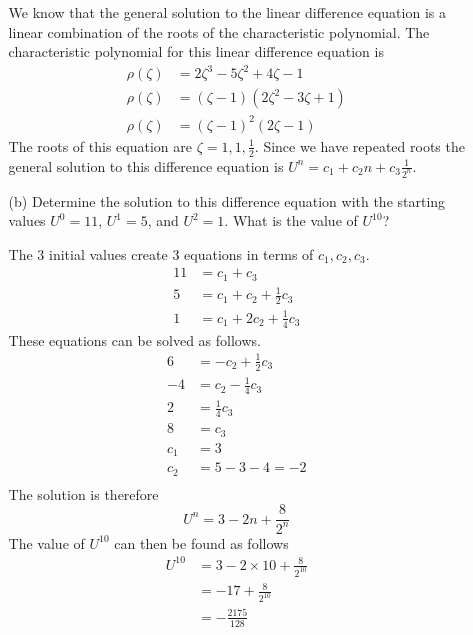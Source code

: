 \documentclass[11pt, oneside, titlepage]{article}
\begin{document}
\begin{enumerate}
\begin{enumerate}
                We know that the general solution to the linear difference
                equation is a linear combination of the roots of the
                characteristic polynomial.
                The characteristic polynomial for this linear difference
                equation is
                \begin{align*}
                    \rho(\zeta) &= 2\zeta^3 - 5\zeta^2 + 4\zeta - 1 \\
                    \rho(\zeta) &= (\zeta - 1)(2\zeta^2 - 3\zeta + 1) \\
                    \rho(\zeta) &= (\zeta - 1)^2(2\zeta - 1)
                \end{align*}
                The roots of this equation are $\zeta = 1, 1, \frac{1}{2}$.
                Since we have repeated roots the general solution to this
                difference equation is $U^n = c_1 + c_2 n + c_3 \frac{1}{2^n}$.

            \item[(b)] %
                Determine the solution to this difference equation with the
                starting values $U^0 = 11$, $U^1 = 5$, and $U^2 = 1$.
                What is the value of $U^{10}$?

                The 3 initial values create 3 equations in terms of
                $c_1, c_2, c_3$.
                \begin{align*}
                    11 &= c_1 + c_3 \\
                    5 &= c_1 + c_2 + \frac{1}{2}c_3 \\
                    1 &= c_1 + 2c_2 + \frac{1}{4}c_3
                \end{align*}
                These equations can be solved as follows.
                \begin{align*}
                    6 &= -c_2 + \frac{1}{2} c_3 \\
                    -4 &= c_2 - \frac{1}{4}c_3 \\
                    2 &= \frac{1}{4}c_3 \\
                    8 &= c_3 \\
                    c_1 &= 3 \\
                    c_2 &= 5 - 3 - 4 = -2 \\
                \end{align*}
                The solution is therefore
                \[
                    U^n = 3 - 2n + \frac{8}{2^n}
                \]
                The value of $U^{10}$ can then be found as follows
                \begin{align*}
                    U^{10} &= 3 - 2 \times 10 + \frac{8}{2^{10}} \\
                    &= -17 + \frac{8}{2^{10}} \\
                    &= -\frac{2175}{128}
                \end{align*}


\end{enumerate}
\end{enumerate}
\end{document}
